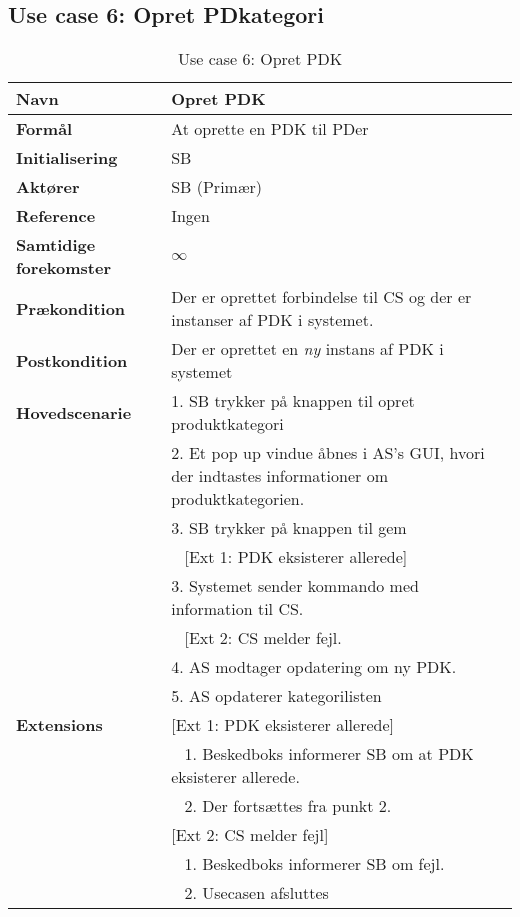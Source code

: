 \subsection{Use case 6: Opret \gls{PD}kategori}


\begin{table}[H]
\begin{tabularx}{\textwidth}{|l|X|}
\hline
\textbf{Navn}					& Opret \gls{PDK} \\\hline
\textbf{Formål}					& At oprette en \gls{PDK} til \gls{PD}er \\\hline
\textbf{Initialisering}			& \gls{SB} \\\hline
\textbf{Aktører}				& \gls{SB} (Primær)\\\hline
\textbf{Reference}				& Ingen \\\hline
								
\textbf{Samtidige forekomster}	& $\infty$ \\\hline

\textbf{Prækondition}			& Der er oprettet forbindelse til \gls{CS} og der er instanser af \gls{PDK} i systemet. \\\hline

\textbf{Postkondition}			& Der er oprettet en \textit{ny} instans af \gls{PDK} i systemet \\\hline

\textbf{Hovedscenarie}			& 1. \gls{SB} trykker på knappen til opret produktkategori \\		
								& 2. Et pop up vindue åbnes i \gls{AS}'s \gls{GUI}, hvori der indtastes informationer om produktkategorien.\\
								& 3. \gls{SB} trykker på knappen til gem\\
								& ~ [Ext 1: \gls{PDK} eksisterer allerede]\\
								& 3. Systemet sender kommando med information til \gls{CS}. \\
								& ~ [Ext 2: \gls{CS} melder fejl.\\
								& 4. \gls{AS} modtager opdatering om ny \gls{PDK}. \\
								& 5. \gls{AS} opdaterer kategorilisten \\\hline

\textbf{Extensions}				
								& [Ext 1: \gls{PDK} eksisterer allerede] \\	
								& ~ 1. Beskedboks informerer \gls{SB} om at \gls{PDK} eksisterer allerede.\\
								& ~ 2. Der fortsættes fra punkt 2.\\
								 		
								& [Ext 2: \gls{CS} melder fejl] \\
								& ~ 1. Beskedboks informerer \gls{SB} om fejl. \\
								& ~ 2. Usecasen afsluttes \\\hline
\end{tabularx}
\caption{Use case 6: Opret \gls{PDK}}
\label{tab:UCopk}
\end{table}